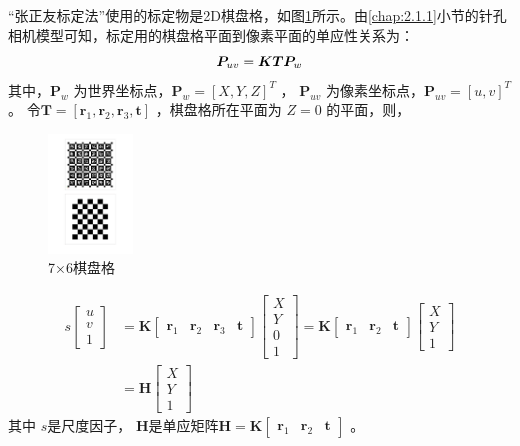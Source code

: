 “张正友标定法”使用的标定物是2D棋盘格，如图\ref{fig2_11}所示。由\ref{chap:2.1.1}小节的针孔相机模型可知，标定用的棋盘格平面到像素平面的单应性关系为：
\[
\setlength{\abovedisplayskip}{6pt}
\setlength{\belowdisplayskip}{6pt}
\boldsymbol{P}_{u v}=\boldsymbol{K} \boldsymbol{T} \boldsymbol{P}_{w}
\]
其中，$\bm{P}_w $  为世界坐标点，$\bm{P}_w = [X,Y,Z]^T$ ， $\bm{P}_{uv} $ 为像素坐标点，$\bm{P}_{uv} = [u,v]^T$ 。
令$\bm{T}=[ \bm{r}_1, \bm{r}_2, \bm{r}_3, \bm{t}] $  ，棋盘格所在平面为 $Z=0 $  的平面，则，
\begin{figure}[h]\setlength{\belowcaptionskip}{-12pt}
	\centering
	\includegraphics[width=0.2\textwidth]{figures/chapter2/fig2_11}
	\caption{7×6棋盘格}\label{fig2_11}
\end{figure}
\begin{equation}
\label{eqn:2.51}
\begin{aligned}
	s \left[ \begin{array}{c}{u} \\ {v} \\ {1}\end{array}\right] 
	&= \bm{K} \left[ \begin{array}{llll}{\bm{r}_{1}} & {\bm{r}_{2}} & {\bm{r}_{3}} & \bm{t}\end{array}\right] \left[ \begin{array}{c}{X} \\ {Y} \\ {0} \\ {1}\end{array}\right]
	= \bm{K} \left[ \begin{array}{lll}{\bm{r}_{1}} & {\bm{r}_{2}} & \bm{t}\end{array}\right] \left[ \begin{array}{c}{X} \\ {Y} \\ {1}\end{array}\right] \\
	&= \bm{H} \left[ \begin{array}{c}{X} \\ {Y} \\ {1}\end{array}\right] 
\end{aligned}
\end{equation}
其中 $s $是尺度因子， $\bm{H} $是单应矩阵$\bm{H}=\bm{K} \left[ \begin{array}{lll}{\bm{r}_{1}} & {\bm{r}_{2}} & \bm{t}\end{array}\right]  $ 。

